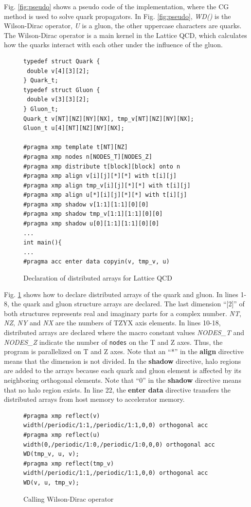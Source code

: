 Fig. \ref{fig:pseudo} shows a pseudo code of the implementation,
where the CG method is used to solve quark propagators.
In Fig. \ref{fig:pseudo},
{\it WD()} is the Wilson-Dirac operator\cite{PhysRevD.10.2445},
{\it U} is a gluon, the other uppercase characters are quarks.
The Wilson-Dirac operator is a main kernel in the Lattice QCD,
which calculates how the quarks interact with each other under the influence of the gluon.

\begin{figure}[h]
\centering
\begin{lstlisting}
typedef struct Quark {
 double v[4][3][2];
} Quark_t;
typedef struct Gluon {
 double v[3][3][2];
} Gluon_t;
Quark_t v[NT][NZ][NY][NX], tmp_v[NT][NZ][NY][NX];
Gluon_t u[4][NT][NZ][NY][NX];

#pragma xmp template t[NT][NZ]
#pragma xmp nodes n[NODES_T][NODES_Z]
#pragma xmp distribute t[block][block] onto n
#pragma xmp align v[i][j][*][*] with t[i][j]
#pragma xmp align tmp_v[i][j][*][*] with t[i][j]
#pragma xmp align u[*][i][j][*][*] with t[i][j]
#pragma xmp shadow v[1:1][1:1][0][0]
#pragma xmp shadow tmp_v[1:1][1:1][0][0]
#pragma xmp shadow u[0][1:1][1:1][0][0]
...
int main(){
...
#pragma acc enter data copyin(v, tmp_v, u)
\end{lstlisting}
\caption{Declaration of distributed arrays for Lattice QCD}\label{fig:distributedQCD}
\end{figure}

Fig. \ref{fig:distributedQCD} shows how to declare distributed arrays of the quark and gluon.
In lines 1-8, the quark and gluon structure arrays are declared.
The last dimension ``[2]'' of both structures represents real and imaginary parts for a complex number.
{\it NT}, {\it NZ},  {\it NY} and {\it NX} are the numbers of TZYX axis elements.
In lines 10-18, distributed arrays are declared where the macro constant values {\it NODES\_T} and {\it NODES\_Z} indicate the number of {\tt nodes} on the T and Z axes.
Thus,
the program is parallelized on T and Z axes.
Note that an ``*'' in the {\bf align} directive means that the dimension is not divided.
In the {\bf shadow} directive,
halo regions are added to the arrays because each quark and gluon element is affected by its neighboring orthogonal elements.
Note that ``0'' in the {\bf shadow} directive means that no halo region exists.
In line 22,
the {\bf enter data} directive transfers the distributed arrays from host memory to accelerator memory.

\begin{figure}[h]
\centering
\begin{lstlisting}
#pragma xmp reflect(v) width(/periodic/1:1,/periodic/1:1,0,0) orthogonal acc
#pragma xmp reflect(u) width(0,/periodic/1:0,/periodic/1:0,0,0) orthogonal acc
WD(tmp_v, u, v);
#pragma xmp reflect(tmp_v) width(/periodic/1:1,/periodic/1:1,0,0) orthogonal acc
WD(v, u, tmp_v);
\end{lstlisting}
\caption{Calling Wilson-Dirac operator}\label{fig:callingDirac}
\end{figure}


